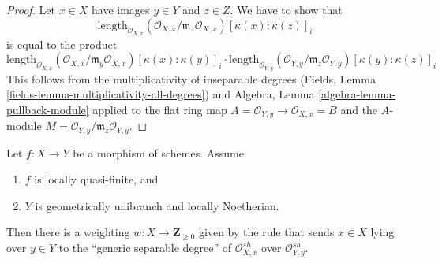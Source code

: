 \begin{proof}
Let $x \in X$ have images $y \in Y$ and $z \in Z$. We have to show that
$$
\text{length}_{\mathcal{O}_{X, x}}
(\mathcal{O}_{X, x}/\mathfrak m_z \mathcal{O}_{X, x})
[\kappa(x) : \kappa(z)]_i
$$
is equal to the product
$$
\text{length}_{\mathcal{O}_{X, x}}
(\mathcal{O}_{X, x}/\mathfrak m_y \mathcal{O}_{X, x})
[\kappa(x) : \kappa(y)]_i
\cdot
\text{length}_{\mathcal{O}_{Y, y}}
(\mathcal{O}_{Y, y}/\mathfrak m_z \mathcal{O}_{Y, y})
[\kappa(y) : \kappa(z)]_i
$$
This follows from the multiplicativity of inseparable degrees
(Fields, Lemma \ref{fields-lemma-multiplicativity-all-degrees})
and
Algebra, Lemma \ref{algebra-lemma-pullback-module}
applied to the flat ring map
$A = \mathcal{O}_{Y, y} \to \mathcal{O}_{X, x} = B$
and the $A$-module
$M = \mathcal{O}_{Y, y}/\mathfrak m_z \mathcal{O}_{Y, y}$.
\end{proof}

\begin{lemma}
\label{lemma-weighting-quasi-finite-Noetherian}
Let $f : X \to Y$ be a morphism of schemes. Assume
\begin{enumerate}
\item $f$ is locally quasi-finite, and
\item $Y$ is geometrically unibranch and locally Noetherian.
\end{enumerate}
Then there is a weighting $w : X \to \mathbf{Z}_{\geq 0}$ given by
the rule that sends $x \in X$ lying over $y \in Y$ to the
``generic separable degree''
of $\mathcal{O}_{X, x}^{sh}$ over $\mathcal{O}_{Y, y}^{sh}$.
\end{lemma}

